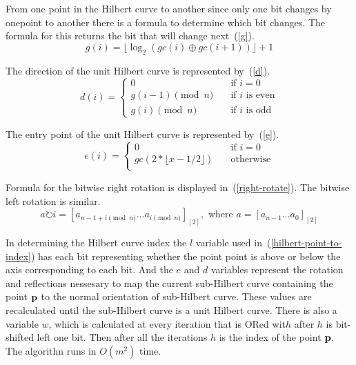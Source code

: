 \documentclass[10pt]{article}
\begin{document}
From one point in the Hilbert curve to another since only one bit changes by onepoint to another there is a formula to determine which bit changes. The formula for this returns the bit that will change next~(\ref{g}).
\begin{equation}
  \label{g}
  g(i) = \lfloor \log _{2} \left( gc(i) \oplus gc(i+1) \right) \rfloor + 1
\end{equation}


The direction of the unit Hilbert curve is represented by~(\ref{d}).
\begin{equation}
  \label{d}
  d(i) = 
    \begin{cases}
      0 & \quad \text{if $i = 0$}\\
      g(i - 1) \pmod{n} & \quad \text{if $i$ is even} \\
      g(i) \pmod{n} & \quad \text{if $i$ is odd}
    \end{cases}
\end{equation}

The entry point of the unit Hilbert curve is represented by~(\ref{e}).
\begin{equation}
  \label{e}
  e(i) =  
    \begin{cases}
      0 & \quad \text{if $i = 0$}\\
      gc(2 * \lfloor x-1/2 \rfloor) & \quad \text{otherwise} \\
    \end{cases}
\end{equation}

Formula for the bitwise right rotation is displayed in~(\ref{right-rotate}). The bitwise left rotation is similar.
\begin{equation}
  \label{right-rotate}
  a \rightturn i = \left[ a_{{n - 1 + i}\pmod{n}} \ldots a_{i\pmod{n}} \right]_{\left[ 2 \right]}, \text{ where } a = \left[ a_{n-1} \ldots a_0\right]_{\left[ 2 \right]} 
\end{equation}

In determining the Hilbert curve index the $l$ variable used in~(\ref{hilbert-point-to-index}) has each bit representing whether the point point is above or below the axis corresponding to each bit. And the $e$ and $d$ variables represent the rotation and reflections nessesary to map the current sub-Hilbert curve containing the point ${\bf p}$ to the normal orientation of sub-Hilbert curve. These values are recalculated until the sub-Hilbert curve is a unit Hilbert curve. There is also a variable $w$, which is calculated at every iteration that is ORed wit$h$ after $h$ is bit-shifted left one bit. Then after all the iterations $h$ is the index of the point ${\bf p}$. The algorithn runs in $O(m^2)$ time.
\end{document}
